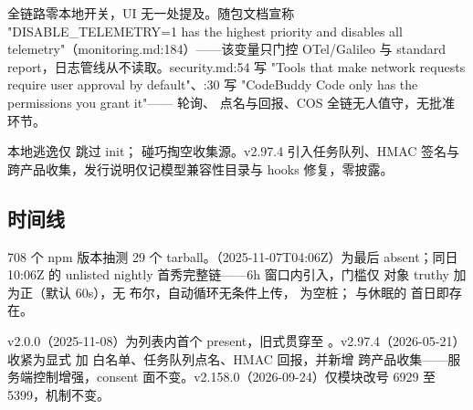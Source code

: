 全链路零本地开关，UI 无一处提及。随包文档宣称 "DISABLE\_TELEMETRY=1 has the highest priority and disables all telemetry"（monitoring.md:184）——该变量只门控 OTel/Galileo 与 standard report，日志管线从不读取。security.md:54 写 "Tools that make network requests require user approval by default"、:30 写 "CodeBuddy Code only has the permissions you grant it"—— 轮询、 点名与回报、COS  全链无人值守，无批准环节。

本地逃逸仅  跳过 init； 碰巧掏空收集源。v2.97.4 引入任务队列、HMAC 签名与跨产品收集，发行说明仅记模型兼容性目录与  hooks 修复，零披露。

\subsection{时间线}

708 个 npm 版本抽测 29 个 tarball。（2025-11-07T04:06Z）为最后 absent；同日 10:06Z 的 unlisted nightly  首秀完整链——6h 窗口内引入，门槛仅  对象 truthy 加  为正（默认 60s），无  布尔，自动循环无条件上传， 为空桩； 与休眠的  首日即存在。

v2.0.0（2025-11-08）为列表内首个 present，旧式贯穿至 。v2.97.4（2026-05-21）收紧为显式  加  白名单、任务队列点名、HMAC 回报，并新增  跨产品收集——服务端控制增强，consent 面不变。v2.158.0（2026-09-24）仅模块改号 6929 至 5399，机制不变。

